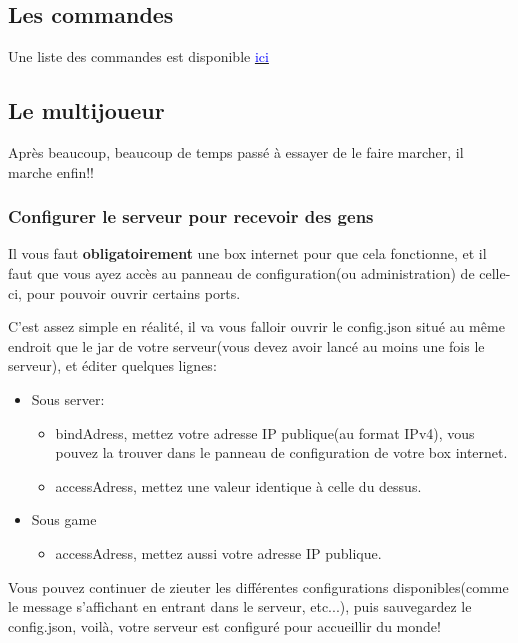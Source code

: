 \documentclass{article}
\begin{document}
\subsection{Les commandes}
Une liste des commandes est disponible \href{https://github.com/Grasscutters/Grasscutter/wiki/Commands}{\textcolor{blue}{ici}}

\subsection{Le multijoueur}
Après beaucoup, beaucoup de temps passé à essayer de le faire marcher, il marche enfin!!

\subsubsection{Configurer le serveur pour recevoir des gens}
Il vous faut \textbf{obligatoirement} une box internet pour que cela fonctionne, et il faut que vous ayez accès au panneau de configuration(ou administration) de celle-ci, pour pouvoir ouvrir certains ports.\newline

C'est assez simple en réalité, il va vous falloir ouvrir le config.json situé au même endroit que le jar de votre serveur(vous devez avoir lancé au moins une fois le serveur), et éditer quelques lignes:
\begin{itemize}
	\item Sous server:
		\begin{itemize}
			\item bindAdress, mettez votre adresse IP publique(au format IPv4), vous pouvez la trouver dans le panneau de configuration de votre box internet.
			\item accessAdress, mettez une valeur identique à celle du dessus.
		\end{itemize}
	\item Sous game
		\begin{itemize}
			\item accessAdress, mettez aussi votre adresse IP publique.
		\end{itemize}
\end{itemize}
Vous pouvez continuer de zieuter les différentes configurations disponibles(comme le message s'affichant en entrant dans le serveur, etc...), puis sauvegardez le config.json, voilà, votre serveur est configuré pour accueillir du monde!\newline
\end{document}
